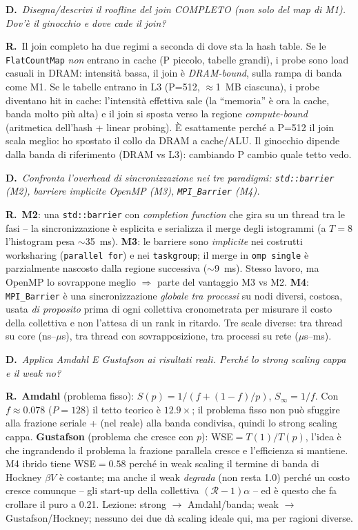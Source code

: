\documentclass[11pt,a4paper]{article}
\newcommand{\D}[1]{\begin{dom}\small\textbf{D.}\ \itshape #1\end{dom}}
\newcommand{\R}{\noindent\textbf{R.}\ }
\begin{document}
\D{Disegna/descrivi il roofline del join COMPLETO (non solo del map di M1). Dov'è il ginocchio e dove cade il join?}
\R Il join completo ha due regimi a seconda di dove sta la hash table. Se le \texttt{FlatCountMap} \emph{non} entrano in cache (P piccolo, tabelle grandi), i probe sono load casuali in DRAM: intensità bassa, il join è \emph{DRAM-bound}, sulla rampa di banda come M1. Se le tabelle entrano in L3 (P=512, $\approx$1~MB ciascuna), i probe diventano hit in cache: l'intensità effettiva sale (la ``memoria'' è ora la cache, banda molto più alta) e il join si sposta verso la regione \emph{compute-bound} (aritmetica dell'hash + linear probing). È esattamente perché a P=512 il join scala meglio: ho spostato il collo da DRAM a cache/ALU. Il ginocchio dipende dalla banda di riferimento (DRAM vs L3): cambiando P cambio quale tetto vedo.

\D{Confronta l'overhead di sincronizzazione nei tre paradigmi: \texttt{std::barrier} (M2), barriere implicite OpenMP (M3), \texttt{MPI\_Barrier} (M4).}
\R \textbf{M2}: una \texttt{std::barrier} con \emph{completion function} che gira su un thread tra le fasi -- la sincronizzazione è esplicita e serializza il merge degli istogrammi (a $T=8$ l'histogram pesa $\sim$35~ms). \textbf{M3}: le barriere sono \emph{implicite} nei costrutti worksharing (\texttt{parallel for}) e nei \texttt{taskgroup}; il merge in \texttt{omp single} è parzialmente nascosto dalla regione successiva ($\sim$9~ms). Stesso lavoro, ma OpenMP lo sovrappone meglio $\Rightarrow$ parte del vantaggio M3 vs M2. \textbf{M4}: \texttt{MPI\_Barrier} è una sincronizzazione \emph{globale tra processi} su nodi diversi, costosa, usata \emph{di proposito} prima di ogni collettiva cronometrata per misurare il costo della collettiva e non l'attesa di un rank in ritardo. Tre scale diverse: tra thread su core (ns--$\mu$s), tra thread con sovrapposizione, tra processi su rete ($\mu$s--ms).

\D{Applica Amdahl E Gustafson ai risultati reali. Perché lo strong scaling cappa e il weak no?}
\R \textbf{Amdahl} (problema fisso): $S(p)=1/(f+(1-f)/p)$, $S_\infty=1/f$. Con $f\approx0.078$ ($P=128$) il tetto teorico è $12.9\times$; il problema fisso non può sfuggire alla frazione seriale + (nel reale) alla banda condivisa, quindi lo strong scaling cappa. \textbf{Gustafson} (problema che cresce con $p$): WSE$=T(1)/T(p)$, l'idea è che ingrandendo il problema la frazione parallela cresce e l'efficienza si mantiene. M4 ibrido tiene WSE$=0.58$ perché in weak scaling il termine di banda di Hockney $\beta V$ è costante; ma anche il weak \emph{degrada} (non resta 1.0) perché un costo cresce comunque -- gli start-up della collettiva $(\mathcal{R}-1)\alpha$ -- ed è questo che fa crollare il puro a 0.21. Lezione: strong $\to$ Amdahl/banda; weak $\to$ Gustafson/Hockney; nessuno dei due dà scaling ideale qui, ma per ragioni diverse.
\end{document}
